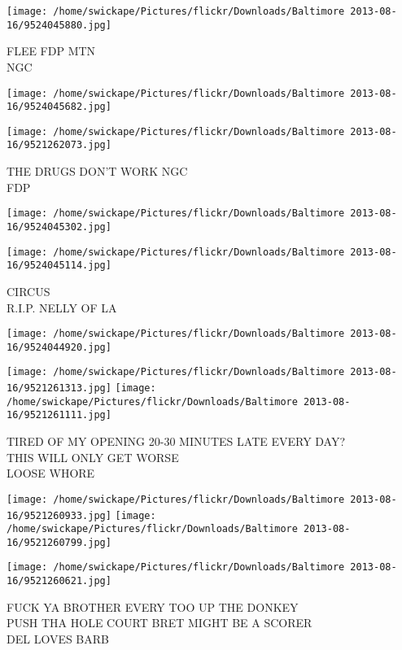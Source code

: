 \documentclass[10pt,letterpaper]{article}
\begin{document}
\vspace{0.25in}
\texttt{[image: /home/swickape/Pictures/flickr/Downloads/Baltimore 2013-08-16/9524045880.jpg]}

FLEE FDP MTN\\
NGC
\pagebreak

\texttt{[image: /home/swickape/Pictures/flickr/Downloads/Baltimore 2013-08-16/9524045682.jpg]}

\vspace{0.25in}
\texttt{[image: /home/swickape/Pictures/flickr/Downloads/Baltimore 2013-08-16/9521262073.jpg]}

THE DRUGS DON'T WORK NGC\\
FDP
\pagebreak

\texttt{[image: /home/swickape/Pictures/flickr/Downloads/Baltimore 2013-08-16/9524045302.jpg]}

\vspace{0.25in}
\texttt{[image: /home/swickape/Pictures/flickr/Downloads/Baltimore 2013-08-16/9524045114.jpg]}

CIRCUS\\
R.I.P. NELLY OF LA
\pagebreak

\texttt{[image: /home/swickape/Pictures/flickr/Downloads/Baltimore 2013-08-16/9524044920.jpg]}

\vspace{0.25in}
\texttt{[image: /home/swickape/Pictures/flickr/Downloads/Baltimore 2013-08-16/9521261313.jpg]}
\texttt{[image: /home/swickape/Pictures/flickr/Downloads/Baltimore 2013-08-16/9521261111.jpg]}

TIRED OF MY OPENING 20{-}30 MINUTES LATE EVERY DAY?\\
THIS WILL ONLY GET WORSE\\
LOOSE WHORE
\pagebreak

\texttt{[image: /home/swickape/Pictures/flickr/Downloads/Baltimore 2013-08-16/9521260933.jpg]}
\texttt{[image: /home/swickape/Pictures/flickr/Downloads/Baltimore 2013-08-16/9521260799.jpg]}

\texttt{[image: /home/swickape/Pictures/flickr/Downloads/Baltimore 2013-08-16/9521260621.jpg]}

FUCK YA BROTHER EVERY TOO UP THE DONKEY\\
PUSH THA HOLE COURT BRET MIGHT BE A SCORER\\
DEL LOVES BARB
\pagebreak
\end{document}
